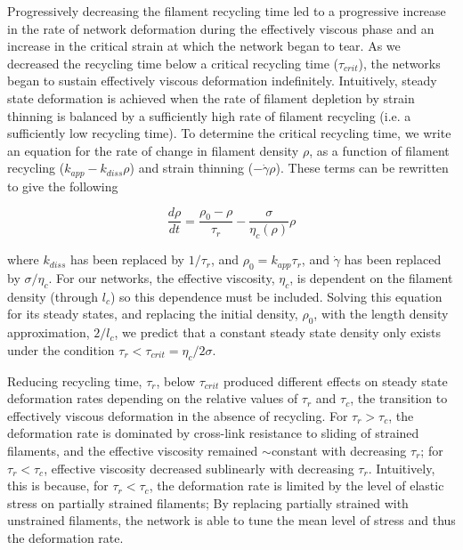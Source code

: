 \documentclass[10pt,letterpaper]{article}
\begin{document}
Progressively decreasing the filament recycling time led to a progressive increase in the rate of network deformation during the effectively viscous phase and an increase in the critical strain at which the network began to tear. As we decreased the recycling time below a critical recycling time ($\tau_{crit}$), the networks began to sustain effectively viscous deformation indefinitely. Intuitively, steady state deformation is achieved when the rate of filament depletion by strain thinning is balanced by a sufficiently high rate of filament recycling (i.e. a sufficiently low recycling time).  To determine the critical recycling time, we write an equation for the rate of change in filament density $\rho$, as a function of filament recycling ($k_{app}-k_{diss}\rho$) and strain thinning ($-\dot{\gamma}\rho$).
These terms can be rewritten to give the following 

\begin{equation}
\frac{d \rho}{dt} = \frac{\rho_0-\rho}{\tau_r}  - \frac{\sigma}{\eta_c(\rho)} \rho
\end{equation}

where $k_{diss}$  has been replaced by $1/\tau_r$, and $\rho_0 = k_{app}\tau_r$, and $\dot{\gamma}$ has been replaced by $\sigma/\eta_c$.  For our networks, the effective viscosity, $\eta_c$, is dependent on the filament density (through $l_c$) so this dependence must be included. Solving this equation for its steady states, and replacing the initial density, $\rho_0$, with the length density approximation, $2/l_c$, we predict that a constant steady state density only exists under the condition $\tau_r < \tau_{crit}=\eta_c/2\sigma$.  

Reducing recycling time, $\tau_r$, below $\tau_{crit}$ produced different effects on steady state deformation rates depending on the relative values of $\tau_r$ and $\tau_c$, the transition to effectively viscous deformation in the absence of recycling.  For $\tau_r > \tau_c$, the deformation rate is dominated by cross-link resistance to sliding of strained filaments, and the effective viscosity remained $\sim$constant with decreasing $\tau_r$; for $\tau_r < \tau_c$, effective viscosity decreased sublinearly with decreasing $\tau_r$. Intuitively, this is because, for $\tau_r < \tau_c$, the deformation rate is limited by the level of elastic stress on partially strained filaments; By replacing partially strained with unstrained filaments, the network is able to tune the mean level of stress and thus the deformation rate.
\end{document}
